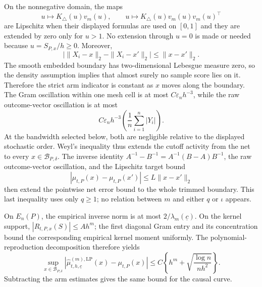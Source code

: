 On the nonnegative domain, the maps
\[
 u\longmapsto K_\triangle(u)v_m(u),
 \qquad
 u\longmapsto K_\triangle(u)v_m(u)v_m(u)^\top
\]
are Lipschitz when their displayed formulas are used on \([0,1]\) and they are extended by zero only for \(u>1\).  No extension through \(u=0\) is made or needed because \(u=S_{P,x}/h\geq0\).  Moreover,
\[
 \bigl|\|X_i-x\|_2-\|X_i-x'\|_2\bigr|\leq\|x-x'\|_2.
\]
The smooth embedded boundary has two-dimensional Lebesgue measure zero, so the density assumption implies that almost surely no sample score lies on it.  Therefore the strict arm indicator is constant as \(x\) moves along the boundary.  The Gram oscillation within one mesh cell is at most \(C\varepsilon_nh^{-3}\), while the raw outcome-vector oscillation is at most
\[
 C\varepsilon_nh^{-3}\left(\frac1n\sum_{i=1}^n|Y_i|\right).
\]
At the bandwidth selected below, both are negligible relative to the displayed stochastic order.  Weyl's inequality thus extends the cutoff activity from the net to every \(x\in\mathcal B_{P,\delta}\).  The inverse identity \(A^{-1}-B^{-1}=A^{-1}(B-A)B^{-1}\), the raw outcome-vector oscillation, and the Lipschitz target bound
\[
 |\mu_{t,P}(x)-\mu_{t,P}(x')|\leq L\|x-x'\|_2
\]
then extend the pointwise net error bound to the whole trimmed boundary.  This last inequality uses only \(q\geq1\); no relation between \(m\) and either \(q\) or \(\iota\) appears.

On \(E_n(P)\), the empirical inverse norm is at most \(2/\lambda_m(\underline c)\).  On the kernel support, \(|R_{t,P,x}(S)|\leq Ah^m\); the first diagonal Gram entry and its concentration bound the corresponding empirical kernel moment uniformly.  The polynomial-reproduction decomposition therefore yields
\[
 \sup_{x\in\mathcal B_{P,\delta}}
 \left|\widehat\mu^{(m),\mathrm{LP}}_{t,h,\underline c}(x)-\mu_{t,P}(x)\right|
 \leq C\left\{h^m+\sqrt{\frac{\log n}{nh^2}}\right\}.
\]
Subtracting the arm estimates gives the same bound for the causal curve.

